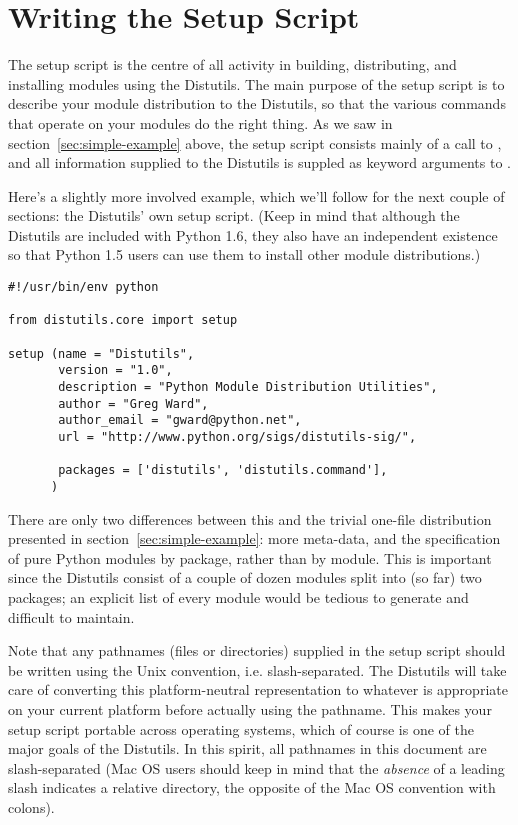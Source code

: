\documentclass{howto}
\begin{document}
\section{Writing the Setup Script}
\label{sec:setup-script}

The setup script is the centre of all activity in building,
distributing, and installing modules using the Distutils.  The main
purpose of the setup script is to describe your module distribution to
the Distutils, so that the various commands that operate on your modules 
do the right thing.  As we saw in section~\ref{sec:simple-example}
above, the setup script consists mainly of a call to , and 
all information supplied to the Distutils is suppled as keyword
arguments to .

Here's a slightly more involved example, which we'll follow for the next
couple of sections: the Distutils' own setup script.  (Keep in mind that
although the Distutils are included with Python 1.6, they also have an
independent existence so that Python 1.5 users can use them to install
other module distributions.)

\begin{verbatim}
#!/usr/bin/env python

from distutils.core import setup

setup (name = "Distutils",
       version = "1.0",
       description = "Python Module Distribution Utilities",
       author = "Greg Ward",
       author_email = "gward@python.net",
       url = "http://www.python.org/sigs/distutils-sig/",

       packages = ['distutils', 'distutils.command'],
      )
\end{verbatim}
There are only two differences between this and the trivial one-file
distribution presented in section~\ref{sec:simple-example}: more
meta-data, and the specification of pure Python modules by package,
rather than by module.  This is important since the Distutils consist of
a couple of dozen modules split into (so far) two packages; an explicit
list of every module would be tedious to generate and difficult to
maintain.

Note that any pathnames (files or directories) supplied in the setup
script should be written using the Unix convention, i.e.
slash-separated.  The Distutils will take care of converting this
platform-neutral representation to whatever is appropriate on your
current platform before actually using the pathname.  This makes your
setup script portable across operating systems, which of course is one
of the major goals of the Distutils.  In this spirit, all pathnames in
this document are slash-separated (Mac OS users should keep in mind that
the \emph{absence} of a leading slash indicates a relative directory,
the opposite of the Mac OS convention with colons).
\end{document}
